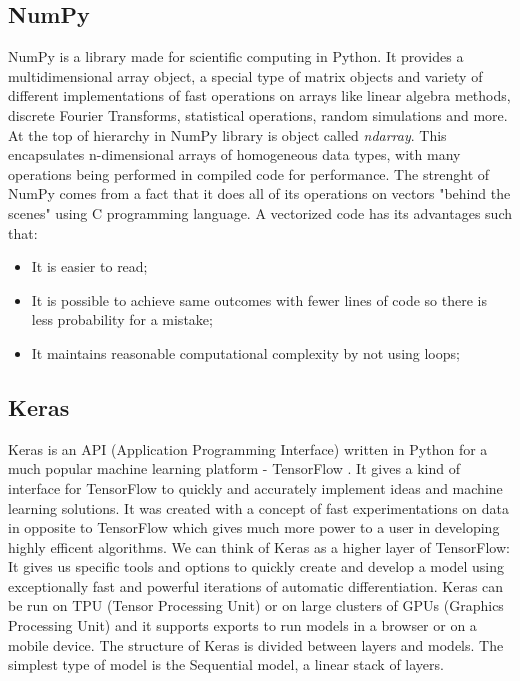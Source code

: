 \documentclass[a4paper,oneside,openright,11pt]{book}
\begin{document}
\subsection{NumPy}


NumPy \cite{numpy} is a library made for scientific computing in Python. It provides a multidimensional array object, a special type of matrix objects and variety of different implementations of fast operations on arrays like linear algebra methods, discrete Fourier Transforms, statistical operations, random simulations and more. At the top of hierarchy in NumPy library is object called \emph{ndarray}. This encapsulates n-dimensional arrays of homogeneous data types, with many operations being performed in compiled code for performance. The strenght of NumPy comes from a fact that it does all of its operations on vectors "behind the scenes" using C programming language. A vectorized code has its advantages such that:

\begin{itemize}
    \item It is easier to read;
    \item It is
    possible to achieve same outcomes with fewer lines of code so there is less probability for a mistake;
    \item It maintains reasonable computational complexity by not using loops;
\end{itemize}


\subsection{Keras}

Keras \cite{Keras} is an API (Application Programming Interface) written in Python for a much popular machine learning platform - TensorFlow \cite{tf}. It gives a kind of interface for TensorFlow to quickly and accurately implement ideas and machine learning solutions. It was created with a concept of fast experimentations on data in opposite to TensorFlow which gives much more power to a user in developing highly efficent algorithms. We can think of Keras as a higher layer of TensorFlow: It gives us specific tools and options to quickly create and develop a model using exceptionally fast and powerful iterations of automatic differentiation. Keras can be run on TPU (Tensor Processing Unit) or on large clusters of GPUs (Graphics Processing Unit) and it supports exports to run models in a browser or on a mobile device. The structure of Keras is divided between layers and models. The simplest type of model is the Sequential model, a linear stack of layers. 
\end{document}
